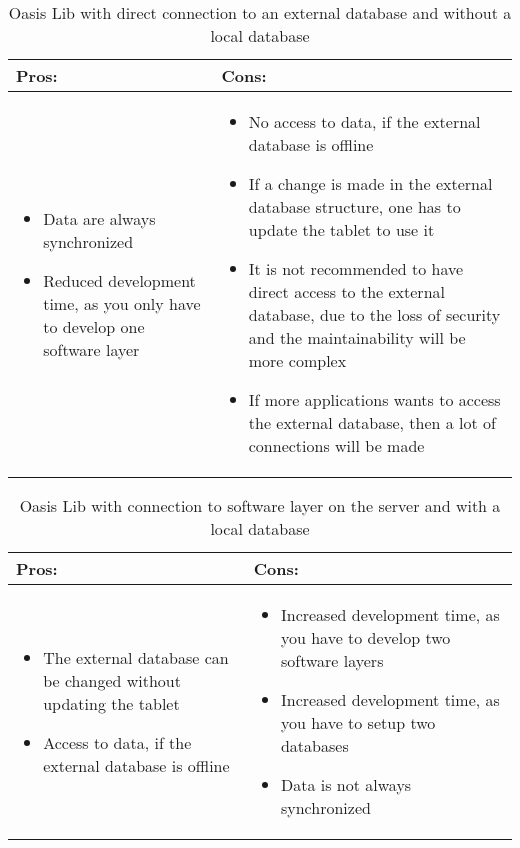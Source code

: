 \begin{table}[htbp]
	\centering
		\begin{tabular}{| p{6cm} | m{6cm} |}
			\hline
			\textbf{Pros:} & \textbf{Cons:} \\ \hline
\begin{itemize}
	\item Data are always synchronized
	\item Reduced development time, as you only have to develop one software layer
\end{itemize}
&
\begin{itemize}
	\item No access to data, if the external database is offline
	\item If a change is made in the external database structure, one has to update the tablet to use it
	\item It is not recommended to have direct access to the external database, due to the loss of security and the maintainability will be more complex
	\item If more applications wants to access the external database, then a lot of connections will be made
\end{itemize}
\\ \hline
		\end{tabular}
	\caption{Oasis Lib with direct connection to an external database and without a local database}
	\label{tab:procon2}
\end{table}
	
\begin{table}[htbp]
	\centering
		\begin{tabular}{| p{6cm} | m{6cm} |}
			\hline
			\textbf{Pros:} & \textbf{Cons:} \\ \hline
\begin{itemize}
	\item The external database can be changed without updating the tablet
	\item Access to data, if the external database is offline
\end{itemize}
&
\begin{itemize}
	\item Increased development time, as you have to develop two software layers
	\item Increased development time, as you have to setup two databases
	\item Data is not always synchronized
\end{itemize}
\\ \hline
		\end{tabular}
	\caption{Oasis Lib with connection to software layer on the server and with a local database}
	\label{tab:procon3}
\end{table}


